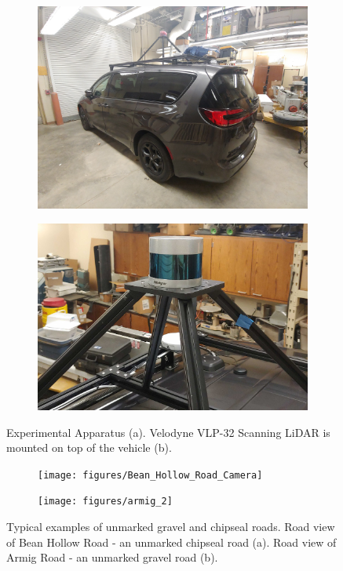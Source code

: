 \documentclass[journal,onecolumn]{IEEEtran}
\begin{document}
	\begin{figure}[H] 
		\centering
		\begin{subfigure}{0.45\textwidth}
			\centering
			\includegraphics[width=0.9\linewidth,height=4.60 cm,keepaspectratio]{figures/Van}
			\caption[Sensor Van]{}
			\label{fig:van}
		\end{subfigure}
		\begin{subfigure}{0.45\textwidth}
			\centering
			\includegraphics[width=0.9\linewidth,height=4.60 cm,keepaspectratio]{figures/vlp_32_mount_2}
			\caption[VLP 32 on Van]{}
			\label{fig:vlp32mount}
		\end{subfigure}
		\caption[Experimental Apparatus]{Experimental Apparatus (a). Velodyne VLP-32 Scanning LiDAR is mounted on top of the vehicle (b).}
		\label{fig:Experimental_Apperatus}
	\end{figure}

	\begin{figure}[H]
		\centering
		\begin{subfigure}{0.45\textwidth}
			\centering
			\texttt{[image: figures/Bean\_Hollow\_Road\_Camera]}
			\caption[Bean Hollow Road Camera View]{}
			\label{fig:Bean_Cam_View}
		\end{subfigure}
		\begin{subfigure}{0.45\textwidth}
			\centering
			\texttt{[image: figures/armig\_2]}
			\caption[Armig Road Camera View]{}
			\label{fig:Armig_Road_Camera_View}
		\end{subfigure}
		\caption[Armig Road \& Bean Hollow Road]{Typical examples of unmarked gravel and chipseal roads. Road view of Bean Hollow Road - an unmarked chipseal road (a). Road view of Armig Road - an unmarked gravel road (b).}
		\label{fig:Combined_Roads}
	\end{figure}
\end{document}
